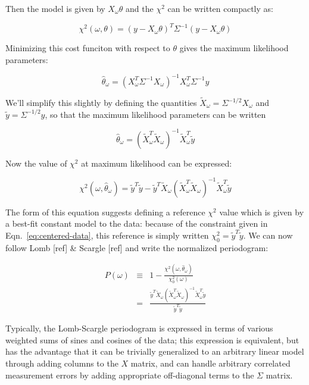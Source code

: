 \documentclass[12pt,preprint]{aastex}
\begin{document}
Then the model is given by $X_\omega\theta$ and the $\chi^2$ can be written
compactly as:

\begin{equation}
  \chi^2(\omega, \theta) = (y - X_\omega\theta)^T\Sigma^{-1}(y - X_\omega\theta)
\end{equation}

Minimizing this cost funciton with respect to $\theta$ gives the maximum likelihood parameters:

\begin{equation}
\hat{\theta}_\omega = (X_\omega^T\Sigma^{-1}X_\omega)^{-1}X_\omega^T\Sigma^{-1}y
\end{equation}

We'll simplify this slightly by defining the quantities $\tilde{X}_\omega = \Sigma^{-1/2}X_\omega$ and $\tilde{y} = \Sigma^{-1/2}y$, so that the maximum likelihood parameters can be written

\begin{equation}
  \hat{\theta}_\omega = (\tilde{X}_\omega^T\tilde{X}_\omega)^{-1}\tilde{X}_\omega^T\tilde{y}
\end{equation}

Now the value of $\chi^2$ at maximum likelihood can be expressed:

\begin{equation}
  \chi^2(\omega, \hat{\theta}_\omega) = \tilde{y}^T\tilde{y} - \tilde{y}^T\tilde{X}_\omega(\tilde{X}_\omega^T\tilde{X}_\omega)^{-1}\tilde{X}_\omega^T \tilde{y}
\end{equation}

The form of this equation suggests defining a reference $\chi^2$ value which is given by a best-fit constant model to the data: because of the constraint given in Eqn.~\ref{eq:centered-data}, this reference is simply written $\chi^2_0 = \tilde{y}^T\tilde{y}$. We can now follow Lomb [ref] \& Scargle [ref] and write the normalized periodogram:

\begin{eqnarray}
  \label{eq:power}
  P(\omega) &\equiv& 1 -\frac{\chi^2(\omega, \hat{\theta}_\omega)}{\chi^2_0(\omega)}\\ &=& \frac{\tilde{y}^T\tilde{X}_\omega(\tilde{X}_\omega^T\tilde{X}_\omega)^{-1}\tilde{X}_\omega^T \tilde{y}}{\tilde{y}^T\tilde{y}}
\end{eqnarray}

Typically, the Lomb-Scargle periodogram is expressed in terms of various weighted sums of sines and cosines of the data; this expression is equivalent, but has the advantage that it can be trivially generalized to an arbitrary linear model through adding columns to the $X$ matrix, and can handle arbitrary correlated measurement errors by adding appropriate off-diagonal terms to the $\Sigma$ matrix.
\end{document}
